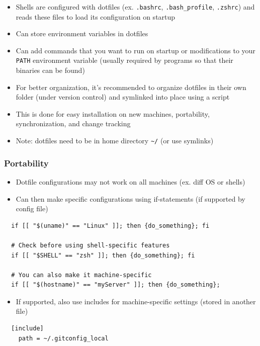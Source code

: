 \documentclass[letterpaper,12pt]{article}
\begin{document}
\begin{itemize}
  \item Shells are configured with dotfiles (ex. \lstinline{.bashrc}, \lstinline{.bash_profile}, \lstinline{.zshrc}) and reads these files to load its configuration on startup
  \item Can store environment variables in dotfiles
  \item Can add commands that you want to run on startup or modifications to your \lstinline{PATH} environment variable (usually required by programs so that their binaries can be found)
  \item For better organization, it's recommended to organize dotfiles in their own folder (under version control) and symlinked into place using a script
  \item This is done for easy installation on new machines, portability, synchronization, and change tracking
  \item Note: dotfiles need to be in home directory \lstinline{~/} (or use symlinks)
\end{itemize}

\subsubsection{Portability}

\begin{itemize}
  \item Dotfile configurations may not work on all machines (ex. diff OS or shells)
  \item Can then make specific configurations using if-statements (if supported by config file)
\end{itemize}

\begin{lstlisting}
  if [[ "$(uname)" == "Linux" ]]; then {do_something}; fi

  # Check before using shell-specific features
  if [[ "$SHELL" == "zsh" ]]; then {do_something}; fi

  # You can also make it machine-specific
  if [[ "$(hostname)" == "myServer" ]]; then {do_something};
\end{lstlisting}

\begin{itemize}
  \item If supported, also use includes for machine-specific settings (stored in another file)
\end{itemize}

\begin{lstlisting}
  [include]
    path = ~/.gitconfig_local
\end{lstlisting}
\end{document}
